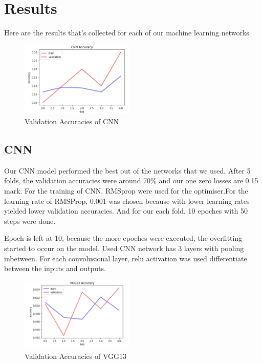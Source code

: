 \section{Results}

Here are the results that's collected for each of our machine learning networks 
\begin{figure}
    \centering
    \includegraphics[width=0.48\textwidth]{Images/cnn.png}
    \caption{Validation Accuracies of CNN}
    \label{fig:NTNU-letters}
\end{figure}
\subsection{CNN}
Our CNN model performed the best out of the networks that we used. After 5 folds, the validation accuracies were around 70\% and our one zero losses are 0.15 mark. For the training of CNN, RMSprop were used for the optimiser.For the learning rate of RMSProp, 0.001 was chosen because with lower learning rates yielded lower validation accuracies. And for our each fold, 10 epoches with 50 steps were done.\par

Epoch is left at 10, because the more epoches were executed, the overfitting started to occur on the model. Used CNN network has 3 layers with pooling inbetween. For each convolusional layer, relu activation was used differentiate between the inputs and outputs.
\begin{figure}
    \centering
    \includegraphics[width=0.48\textwidth]{Images/vgg13.png}
    \caption{Validation Accuracies of VGG13}
    \label{fig:NTNU-letters}
\end{figure}
